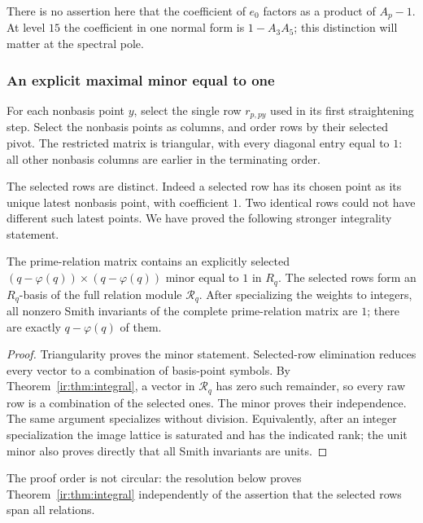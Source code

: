 There is no assertion here that the coefficient of $e_0$ factors as a
product of $A_p-1$. At level $15$ the coefficient in one normal form is
$1-A_3A_5$; this distinction will matter at the spectral pole.

\subsubsection{An explicit maximal minor equal to one}
For each nonbasis point $y$, select the single row $r_{p,py}$ used in
its first straightening step. Select the nonbasis points as columns,
and order rows by their selected pivot. The restricted matrix is
triangular, with every diagonal entry equal to $1$: all other nonbasis
columns are earlier in the terminating order.

The selected rows are distinct. Indeed a selected row has its chosen
point as its unique latest nonbasis point, with coefficient $1$. Two
identical rows could not have different such latest points.
We have proved the following stronger integrality statement.

\begin{theorem}
\label{ir:thm:minor}
The prime-relation matrix contains an explicitly selected
$(q-\varphi(q))\times(q-\varphi(q))$ minor equal to $1$ in $R_q$.
The selected rows form an $R_q$-basis of the full relation module
$\mathcal R_q$. After specializing the weights to integers, all nonzero Smith
invariants of the complete prime-relation matrix are $1$; there are
exactly $q-\varphi(q)$ of them.
\end{theorem}
\begin{proof}
Triangularity proves the minor statement. Selected-row elimination
reduces every vector to a combination of basis-point symbols. By
Theorem~\ref{ir:thm:integral}, a vector in $\mathcal R_q$ has zero such
remainder, so every raw row is a combination of the selected ones.
The minor proves their independence. The same argument specializes
without division. Equivalently, after an integer specialization the
image lattice is saturated and has the indicated rank; the unit minor
also proves directly that all Smith invariants are units.
\end{proof}
The proof order is not circular: the resolution below proves
Theorem~\ref{ir:thm:integral} independently of the assertion that the
selected rows span all relations.

